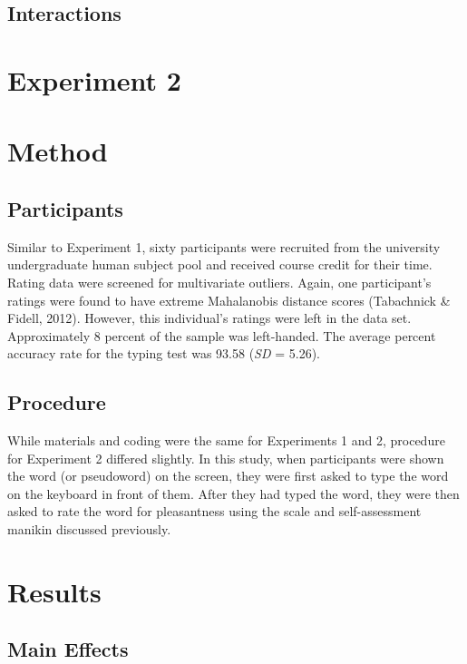 \documentclass[english,man]{apa6}
\theoremstyle{definition}
\theoremstyle{definition}
\theoremstyle{definition}
\theoremstyle{remark}
\begin{document}
\subsection{Interactions}\label{interactions}

\section{Experiment 2}\label{experiment-2}

\section{Method}\label{method-1}

\subsection{Participants}\label{participants-1}

Similar to Experiment 1, sixty participants were recruited from the
university undergraduate human subject pool and received course credit
for their time. Rating data were screened for multivariate outliers.
Again, one participant's ratings were found to have extreme Mahalanobis
distance scores (Tabachnick \& Fidell, 2012). However, this individual's
ratings were left in the data set. Approximately 8 percent of the sample
was left-handed. The average percent accuracy rate for the typing test
was 93.58 (\emph{SD} = 5.26).

\subsection{Procedure}\label{procedure-1}

While materials and coding were the same for Experiments 1 and 2,
procedure for Experiment 2 differed slightly. In this study, when
participants were shown the word (or pseudoword) on the screen, they
were first asked to type the word on the keyboard in front of them.
After they had typed the word, they were then asked to rate the word for
pleasantness using the scale and self-assessment manikin discussed
previously.

\section{Results}\label{results-1}

\subsection{Main Effects}\label{main-effects-1}
\end{document}
